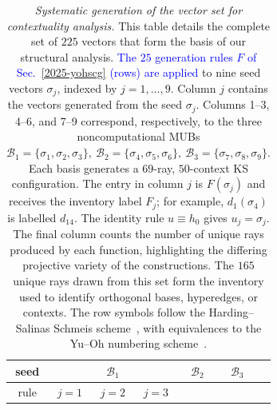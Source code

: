 \documentclass[%
  reprint,
  superscriptaddress,
  showkeys,
  amsmath,amssymb,
  aps,pra,
  longbibliography,
  floatfix,
  x11names
]{revtex4-2}
\DeclareRobustCommand{\chg}[1]{\textcolor{blue}{#1}}
\begin{document}
\begin{table}[htbp]
\caption{\label{tab:vector_generation}
\textit{Systematic generation of the vector set for contextuality analysis.}
This table details the complete set of $225$ vectors that form the basis of our structural analysis.
\chg{The $25$ generation rules \(F\) of Sec.~\ref{2025-yohscg} (rows) are applied} to nine seed vectors \(\sigma_j\), indexed by \(j=1,\ldots,9\). Column \(j\) contains the vectors generated from the seed \(\sigma_j\). Columns 1--3, 4--6, and 7--9 correspond, respectively, to the three noncomputational MUBs
\(
\mathcal B_1=\{\sigma_1,\sigma_2,\sigma_3\},\
\mathcal B_2=\{\sigma_4,\sigma_5,\sigma_6\},\
\mathcal B_3=\{\sigma_7,\sigma_8,\sigma_9\}.
\)
Each basis generates a $69$-ray, $50$-context KS configuration. The entry in column \(j\) is \(F(\sigma_j)\) and receives the inventory label \(F_j\); for example, \(d_1(\sigma_4)\) is labelled \(d_{14}\). The identity rule \(u\equiv h_0\) gives \(u_j=\sigma_j\).
The final column counts the number of unique rays produced by each function,
highlighting the differing projective variety of the constructions.
The $165$ unique rays drawn from this set form the inventory used to identify orthogonal bases, hyperedges, or contexts.
The row symbols follow the Harding--Salinas Schmeis scheme~\cite{harding2025remarksIJTP},
with equivalences to the Yu--Oh numbering scheme~\cite{Yu-2012}.
}
\begin{ruledtabular}
\begin{tabular}{ccccccccccc}
seed&
      \multicolumn{3}{c|}{$\mathcal{B}_1$}&
      \multicolumn{3}{c|}{$\mathcal{B}_2$}&
      \multicolumn{3}{c}{$\mathcal{B}_3$}\\
\hline
rule & 
$j=1$ &
$j=2$ &
$j=3$ &

\end{tabular}
\end{ruledtabular}
\end{table}
\end{document}
